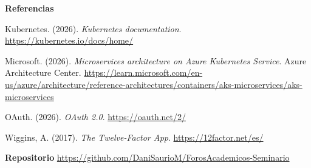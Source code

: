 \documentclass[12pt,letterpaper]{article}
\begin{document}
\textbf{Referencias}

Kubernetes. (2026). \textit{Kubernetes documentation}. \url{https://kubernetes.io/docs/home/}

Microsoft. (2026). \textit{Microservices architecture on Azure Kubernetes Service}. Azure Architecture Center. \url{https://learn.microsoft.com/en-us/azure/architecture/reference-architectures/containers/aks-microservices/aks-microservices}

OAuth. (2026). \textit{OAuth 2.0}. \url{https://oauth.net/2/}

Wiggins, A. (2017). \textit{The Twelve-Factor App}. \url{https://12factor.net/es/}

\textbf{Repositorio}
\noindent\url{https://github.com/DaniSaurioM/ForosAcademicos-Seminario}
\end{document}
